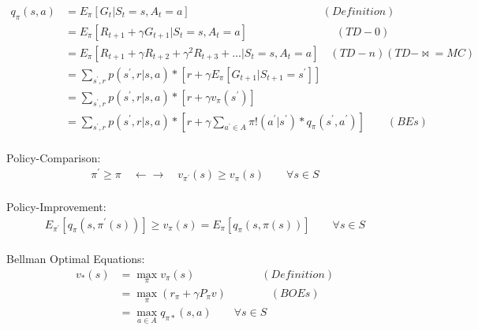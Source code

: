 \documentclass{article}
\begin{document}
\begin{align*}
    q_{\pi}(s, a) 
      &= E_{\pi} [ G_{t} | S_{t}=s, A_{t}=a ] 
      \qquad \qquad \qquad \qquad \qquad \qquad (Definition) \\[3pt]
      &= E_{\pi} [ R_{t+1} + \gamma G_{t+1} | S_{t}=s, A_{t}=a ] 
         \qquad \qquad \qquad \qquad (TD-0) \\[3pt]
      &= E_{\pi} [ R_{t+1} + \gamma R_{t+2} + \gamma^2 R_{t+3} + ... | S_{t}=s, A_{t}=a ] 
         \quad (TD-n)(TD-\Join = MC) \\[3pt]
      &= \sum_{s^{\prime}, r} 
         p ( s^{\prime}, r | s, a ) * 
         [ r + \gamma E_{\pi} [ G_{t+1} | S_{t+1}=s^{\prime} ] ] \\[3pt]
      &= \sum_{s^{\prime}, r} 
         p ( s^{\prime}, r | s, a ) * 
         [ r + \gamma v_{\pi} ( s^{\prime} ) ] \\[3pt]
      &= \sum_{s^{\prime}, r} 
         p ( s^{\prime}, r | s, a ) * 
         [ r + \gamma \sum_{a^{\prime} \in A} 
         \pi ! ( a^{\prime} | s^{\prime} ) * q_{\pi} ( s^{\prime}, a^{\prime} ) ] 
         \quad \quad (BEs) \\[3pt]
\end{align*}


\newpage


Policy-Comparison: 
\begin{align*}
    \pi^{\prime} \geq \pi 
    \quad \leftarrow \rightarrow \quad 
    v_{\pi^{\prime}}(s) \geq v_{\pi}(s) 
    \qquad \forall s \in S 
\end{align*}
\\[3pt]


Policy-Improvement: 
\begin{align*}
    E_{\pi^{\prime}} 
    [ q_{\pi} ( s, \pi^{\prime}(s) ) ] 
    \geq v_{\pi}(s) 
    = E_{\pi} [ q_{\pi} ( s, \pi(s) ) ] 
    \qquad \forall s \in S 
\end{align*}
\\[3pt]


Bellman Optimal Equations: 
\begin{align*}
    v_{*}(s) 
    & = \max_{\pi} v_{\pi}(s) 
        \qquad \qquad \qquad (Definition) \\[3pt]
    & = \max_{\pi} ( r_{\pi} + \gamma P_{\pi} v ) 
        \qquad \qquad (BOEs) \\[3pt]
    & = \max_{a \in A} q_{\pi *}(s, a) 
        \qquad \forall s \in S \\[3pt]
\end{align*}
\\[3pt]
\end{document}
